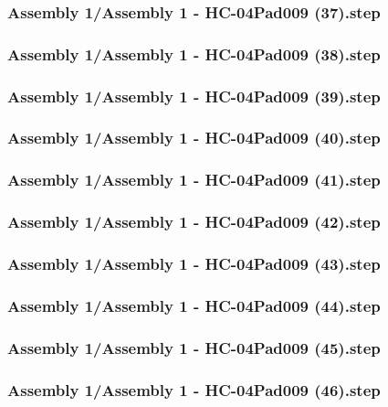 \documentclass[a4paper,12pt]{article}
\begin{document}
\begin{lstlising}[language=C++]
\subsubsection{Assembly 1/Assembly 1 - HC-04Pad009 (37).step}

\subsubsection{Assembly 1/Assembly 1 - HC-04Pad009 (38).step}

\subsubsection{Assembly 1/Assembly 1 - HC-04Pad009 (39).step}

\subsubsection{Assembly 1/Assembly 1 - HC-04Pad009 (40).step}

\subsubsection{Assembly 1/Assembly 1 - HC-04Pad009 (41).step}

\subsubsection{Assembly 1/Assembly 1 - HC-04Pad009 (42).step}

\subsubsection{Assembly 1/Assembly 1 - HC-04Pad009 (43).step}

\subsubsection{Assembly 1/Assembly 1 - HC-04Pad009 (44).step}

\subsubsection{Assembly 1/Assembly 1 - HC-04Pad009 (45).step}

\subsubsection{Assembly 1/Assembly 1 - HC-04Pad009 (46).step}


\end{lstlising}
\end{document}
